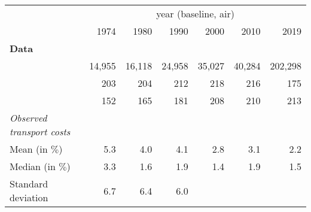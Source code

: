 \begin{tabular}{lllllll}
\cline{1-7}
\multicolumn{1}{c}{} &
  \multicolumn{6}{|c}{year (baseline, air)} \\
\multicolumn{1}{c}{} &
  \multicolumn{1}{|r}{1974} &
  \multicolumn{1}{r}{1980} &
  \multicolumn{1}{r}{1990} &
  \multicolumn{1}{r}{2000} &
  \multicolumn{1}{r}{2010} &
  \multicolumn{1}{r}{2019} \\
\cline{1-7}
\multicolumn{1}{l}{\textbf{Data}} &
  \multicolumn{1}{|r}{} &
  \multicolumn{1}{r}{} &
  \multicolumn{1}{r}{} &
  \multicolumn{1}{r}{} &
  \multicolumn{1}{r}{} &
  \multicolumn{1}{r}{} \\
\multicolumn{1}{l}{\hspace{1em}{$\#$ obs.}} &
  \multicolumn{1}{|r}{14,955} &
  \multicolumn{1}{r}{16,118} &
  \multicolumn{1}{r}{24,958} &
  \multicolumn{1}{r}{35,027} &
  \multicolumn{1}{r}{40,284} &
  \multicolumn{1}{r}{202,298} \\
\multicolumn{1}{l}{\hspace{1em}{$\#$ sectors}} &
  \multicolumn{1}{|r}{203} &
  \multicolumn{1}{r}{204} &
  \multicolumn{1}{r}{212} &
  \multicolumn{1}{r}{218} &
  \multicolumn{1}{r}{216} &
  \multicolumn{1}{r}{175} \\
\multicolumn{1}{l}{\hspace{1em}{$\#$ origin countries}} &
  \multicolumn{1}{|r}{152} &
  \multicolumn{1}{r}{165} &
  \multicolumn{1}{r}{181} &
  \multicolumn{1}{r}{208} &
  \multicolumn{1}{r}{210} &
  \multicolumn{1}{r}{213} \\
\multicolumn{1}{l}{{\textit{Observed transport costs}}} &
  \multicolumn{1}{|r}{} &
  \multicolumn{1}{r}{} &
  \multicolumn{1}{r}{} &
  \multicolumn{1}{r}{} &
  \multicolumn{1}{r}{} &
  \multicolumn{1}{r}{} \\
\multicolumn{1}{l}{\hspace{1em}Mean (in $\%$)} &
  \multicolumn{1}{|r}{5.3} &
  \multicolumn{1}{r}{4.0} &
  \multicolumn{1}{r}{4.1} &
  \multicolumn{1}{r}{2.8} &
  \multicolumn{1}{r}{3.1} &
  \multicolumn{1}{r}{2.2} \\
\multicolumn{1}{l}{\hspace{1em}Median (in $\%$)} &
  \multicolumn{1}{|r}{3.3} &
  \multicolumn{1}{r}{1.6} &
  \multicolumn{1}{r}{1.9} &
  \multicolumn{1}{r}{1.4} &
  \multicolumn{1}{r}{1.9} &
  \multicolumn{1}{r}{1.5} \\
\multicolumn{1}{l}{\hspace{1em}Standard deviation} &
  \multicolumn{1}{|r}{6.7} &
  \multicolumn{1}{r}{6.4} &
  \multicolumn{1}{r}{6.0} &

\end{tabular}

